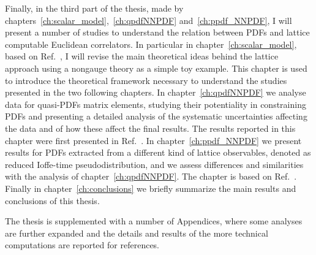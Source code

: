 %
Finally, in the third part of the thesis, made by chapters~\ref{ch:scalar_model},~\ref{ch:qpdfNNPDF} and~\ref{ch:ppdf_NNPDF}, 
I will present a number of studies to understand the relation between PDFs and lattice computable
Euclidean correlators.
In particular in chapter~\ref{ch:scalar_model}, based on Ref.~\cite{DelDebbio:2020cbz},
I will revise the main theoretical ideas behind the lattice approach
using a nongauge theory as a simple toy example. This chapter is used to introduce the theoretical framework necessary
to understand the studies presented in the two following chapters.
In chapter~\ref{ch:qpdfNNPDF} we analyse data for quasi-PDFs matrix elements, studying their potentiality
in constraining PDFs and presenting a detailed analysis of the systematic uncertainties affecting the data and of how
these affect the final results. The results reported in this chapter were first presented in Ref.~\cite{Cichy:2019ebf}.
In chapter~\ref{ch:ppdf_NNPDF} we present results for PDFs extracted from a different kind of lattice 
observables, denoted as reduced Ioffe-time pseudodistribution, and we assess differences and similarities with
the analysis of chapter~\ref{ch:qpdfNNPDF}. The chapter is based on Ref.~\cite{DelDebbio:2020rgv}.
Finally in chapter~\ref{ch:conclusions} we briefly summarize the main results and conclusions of this thesis. 

The thesis is supplemented with a number of Appendices, where some analyses are further expanded and 
the details and results of the more technical computations are reported for references. 




